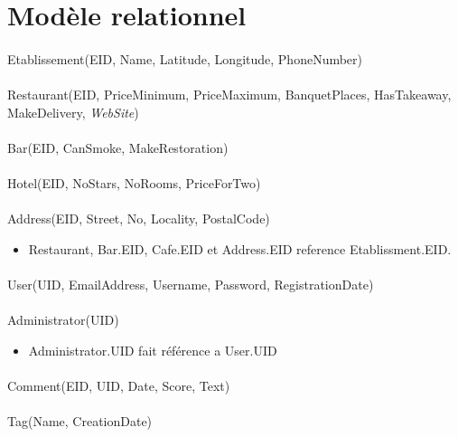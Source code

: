 \documentclass{article}
\begin{document}
\section{Modèle relationnel}
\noindent
\paragraph{}
Etablissement(EID, Name, Latitude, Longitude, PhoneNumber)
\paragraph{}
Restaurant(EID, PriceMinimum, PriceMaximum, BanquetPlaces, HasTakeaway, MakeDelivery, \textsl{WebSite})
\paragraph{}
Bar(EID, CanSmoke, MakeRestoration)
\paragraph{}
Hotel(EID, NoStars, NoRooms, PriceForTwo)
\paragraph{}
Address(EID, Street, No, Locality, PostalCode)

\begin{itemize}
    \item Restaurant, Bar.EID, Cafe.EID et Address.EID reference Etablissment.EID.
\end{itemize}
\paragraph{}
User(UID, EmailAddress, Username, Password, RegistrationDate) 
\paragraph{}
Administrator(UID) 

\begin{itemize}
    \item Administrator.UID fait référence a User.UID
\end{itemize}
\paragraph{}
Comment(EID, UID, Date, Score, Text) 
\paragraph{}
Tag(Name, CreationDate)
\end{document}

